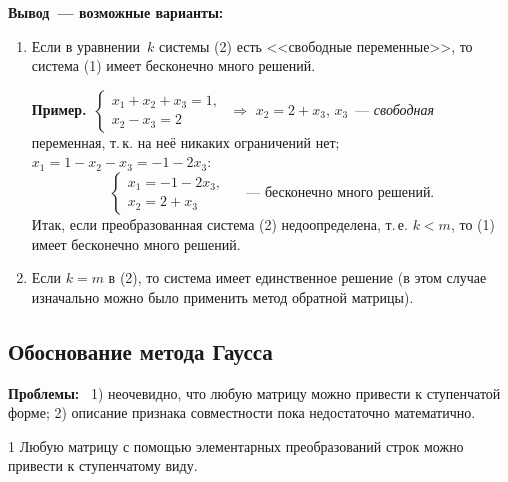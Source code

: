 \documentclass[a4paper,11pt]{article}
\newcommand{\lead}[1]{\textbf{\color{leadcol}#1}\ }
\newcommand{\prim}{\textbf{Пример.}\ }
\begin{document}
\textbf{Вывод~--- возможные варианты:}
\begin{enumerate}[label=\arabic*)]
\item Если в уравнении \textnumero\,$k$ системы (2) есть <<свободные переменные>>, то система (1)
имеет бесконечно много решений.

\prim $\begin{cases}x_1+x_2+x_3=1,\\ x_2-x_3=2\end{cases}$
$\Rightarrow$ $x_2=2+x_3$, $x_3$~--- \emph{свободная} переменная, т.\,к. на неё никаких ограничений
нет; $x_1=1-x_2-x_3=-1-2x_3$:
\[
\begin{cases}x_1=-1-2x_3,\\x_2=2+x_3\end{cases}\quad\text{~--- бесконечно много решений.}
\]
Итак, если преобразованная система (2) недоопределена, т.\,е. $k<m$, то (1) имеет бесконечно много
решений.
\item Если $k=m$ в (2), то система имеет единственное решение (в этом случае изначально можно
было применить метод обратной матрицы).
\end{enumerate}

\subsection{Обоснование метода Гаусса}
\lead{Проблемы:} 1) неочевидно, что любую матрицу можно привести к ступенчатой форме;
2) описание признака совместности пока недостаточно математично.

\begin{teor}{1}
Любую матрицу с помощью элементарных преобразований строк можно привести к ступенчатому виду.
\end{teor}
\end{document}
